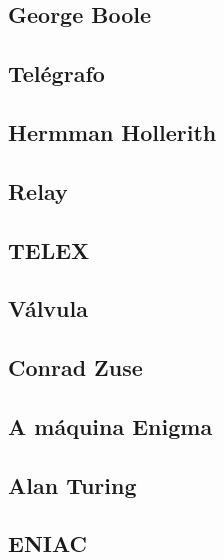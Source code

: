 	\subsection[George Boole]{George Boole}

	
	\subsection[Telégrafo]{Telégrafo}

	
	\subsection[Hermman Hollerith]{Hermman Hollerith}


	\subsection[Relay]{Relay}

	
	\subsection[TELEX]{TELEX}


	\subsection[Válvula]{Válvula}

	
	\subsection[Conrad Zuse]{Conrad Zuse}

	
	\subsection[A máquina Enigma]{A máquina Enigma}

	
	\subsection[Alan Turing]{Alan Turing}

	
	\subsection[ENIAC]{ENIAC}


